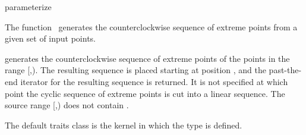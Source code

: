 

\begin{ccRefFunction}{parameterize}  %


\ccDefinition
  
The function \ccRefName\ generates the counterclockwise sequence of extreme
points from a given set of input points.



            {generates the counterclockwise sequence of extreme points
            of the points in the range [,).
            The resulting sequence is placed starting at position
            , and the past-the-end iterator for the resulting
            sequence is returned. It is not specified at which point the
            cyclic sequence of extreme points is cut into a linear sequence.
            \ccPrecond %
            The source range [,) does not contain
            .}

The default traits class  is the kernel in which the
type  is defined.


\end{ccRefFunction}
